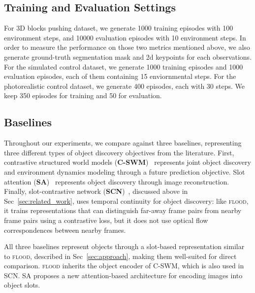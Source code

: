 \documentclass{article}
\begin{document}
\subsection{Training and Evaluation Settings}
For 3D blocks pushing dataset, we generate 1000 training episodes with 100 environment steps, and 10000 evaluation episodes with 10 environment steps. In order to measure the performance on those two metrics mentioned above, we also generate ground-truth segmentation mask and 2d keypoints for each observations. 
For the simulated control dataset, we generate 1000 training episodes and 1000 evaluation episodes, each of them containing 15 enviornmental steps.
For the photorealistic control dataset, we generate 400 episodes, each with 30 steps. We keep 350 episodes for training and 50 for evaluation.
\subsection{Baselines}

Throughout our experiments, we compare against three baselines, representing three different types of object discovery objectives from the literature. First, contrastive structured world models (\textbf{C-SWM})~\cite{kipf2019contrastive} represents joint object discovery and environment dynamics modeling through a future prediction objective. Slot attention (\textbf{SA})~\cite{locatello2020object} represents object discovery through image reconstruction. Finally, slot-contrastive network (\textbf{SCN})~\cite{racah2020slot}, discussed above in Sec~\ref{sec:related_work}, uses temporal continuity for object discovery: like \textsc{flood}, it trains representations that can distinguish far-away frame pairs from nearby frame pairs using a contrastive loss, but it does not use optical flow correspondences between nearby frames.

All three baselines represent objects through a slot-based representation similar to \textsc{flood}, described in Sec~\ref{sec:approach}, making them well-suited for direct comparison. \textsc{flood} inherits the object encoder of C-SWM, which is also used in SCN. SA proposes a new attention-based architecture for encoding images into object slots.


\end{document}
